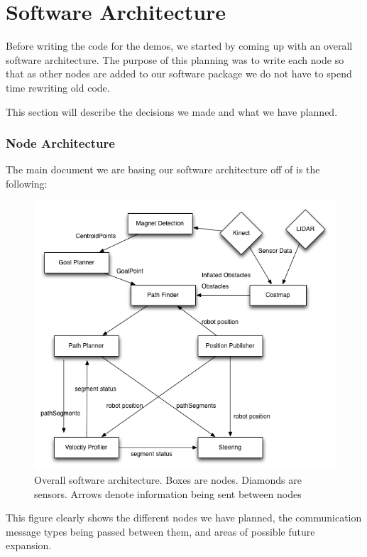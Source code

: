 \part{Software Architecture}

Before writing the code for the demos, we started by coming up with an
overall software architecture.  The purpose of this planning was to
write each node so that as other nodes are added to our software
package we do not have to spend time rewriting old code.

This section will describe the decisions we made and what we have
planned.

\section{Node Architecture}

The main document we are basing our software architecture off of is
the following:

\FloatBarrier
\begin{figure}[h]
  \centering
  \includegraphics{images/software_architecture.png}
  \caption{Overall software architecture.  Boxes are nodes. Diamonds are sensors.  Arrows denote information being sent between nodes}
  \end{figure}
\FloatBarrier


This figure clearly shows the different nodes we have planned, the
communication message types being passed between them, and areas of
possible future expansion.

